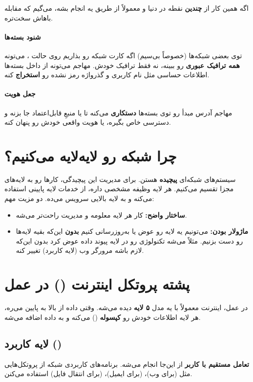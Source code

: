 اگه همین کار از \textbf{چندین} نقطه در دنیا و معمولاً از طریق یه  انجام بشه، می‌گیم  که مقابله باهاش سخت‌تره.

\paragraph{شنود بسته‌ها }
توی بعضی شبکه‌ها (خصوصاً بی‌سیم) اگه کارت شبکه رو بذاریم روی حالت ، می‌تونه \textbf{همه ترافیک عبوری} رو ببینه، نه فقط ترافیک خودش. مهاجم می‌تونه از داخل بسته‌ها اطلاعات حساسی مثل نام کاربری و گذرواژه رمز نشده رو \textbf{استخراج} کنه.

\paragraph{جعل هویت }
مهاجم آدرس  مبدأ رو توی بسته‌ها \textbf{دستکاری} می‌کنه تا یا منبعِ قابل‌اعتماد جا بزنه و دسترسی خاص بگیره، یا هویت واقعی خودش رو پنهان کنه.

\section{چرا شبکه رو لایه‌لایه می‌کنیم؟}
سیستم‌های شبکه‌ای \textbf{پیچیده} هستن. برای مدیریت این پیچیدگی، کارها رو به لایه‌های مجزا تقسیم می‌کنیم. هر لایه وظیفه مشخصی داره، از خدمات لایه پایینی استفاده می‌کنه و به لایه بالایی سرویس می‌ده. دو مزیت مهم:
\begin{itemize}
  \item \textbf{ساختار واضح:} کار هر لایه معلومه و مدیریت راحت‌تر می‌شه.
  \item \textbf{ماژولار بودن:} می‌تونیم یه لایه رو عوض یا به‌روزرسانی کنیم \textbf{بدون} این‌که بقیه لایه‌ها رو دست بزنیم. مثلاً می‌شه تکنولوژی  رو در لایه پیوند داده عوض کرد بدون این‌که لازم باشه مرورگر وب (لایه کاربرد) تغییر کنه.
\end{itemize}

\section{پشته پروتکل اینترنت () در عمل}
در عمل، اینترنت معمولاً با یه مدل \textbf{۵ لایه} دیده می‌شه. وقتی داده از بالا به پایین می‌ره، هر لایه اطلاعات خودش رو \textbf{کپسوله} () می‌کنه و به داده اضافه می‌شه.

\subsection{لایه کاربرد ()}
\textbf{تعامل مستقیم با کاربر} از این‌جا انجام می‌شه. برنامه‌های کاربردی شبکه از پروتکل‌هایی مثل  (برای وب)،  (برای ایمیل)،  (برای انتقال فایل) استفاده می‌کنن.

